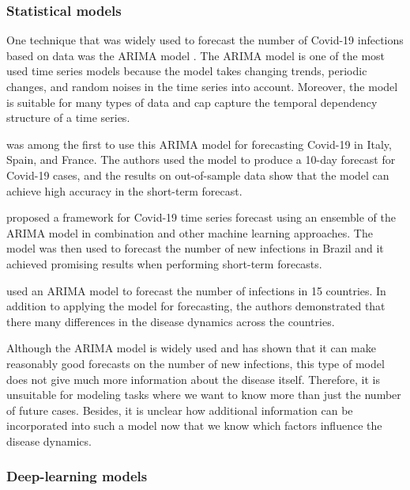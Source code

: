 \subsubsection{Statistical models}

One technique that was widely used to forecast the number of Covid-19 infections based on data was the \gls{ARIMA} model \cite{box2015time}.
The \gls{ARIMA} model is one of the most used time series models because the model takes changing trends, periodic changes, and random noises in the time series into account.
Moreover, the model is suitable for many types of data and cap capture the temporal dependency structure of a time series.

\citeauthor{ceylanEstimationCOVID19Prevalence2020} \cite{ceylanEstimationCOVID19Prevalence2020} was among the first to use this \gls{ARIMA} model for forecasting Covid-19 in Italy, Spain, and France.
The authors used the model to produce a 10-day forecast for Covid-19 cases, and the results on out-of-sample data show that the model can achieve high accuracy in the short-term forecast.

\citeauthor{ribeiroShorttermForecastingCOVID192020} \cite{ribeiroShorttermForecastingCOVID192020} proposed a framework for Covid-19 time series forecast using an ensemble of the \gls{ARIMA} model in combination and other machine learning approaches.
The model was then used to forecast the number of new infections in Brazil and it achieved promising results when performing short-term forecasts.

\citeauthor{singhPredictionCOVID19Pandemic2020} \cite{singhPredictionCOVID19Pandemic2020} used an \gls{ARIMA} model to forecast the number of infections in 15 countries.
In addition to applying the model for forecasting, the authors demonstrated that there many differences in the disease dynamics across the countries.

Although the \gls{ARIMA} model is widely used and has shown that it can make reasonably good forecasts on the number of new infections, this type of model does not give much more information about the disease itself.
Therefore, it is unsuitable for modeling tasks where we want to know more than just the number of future cases.
Besides, it is unclear how additional information can be incorporated into such a model now that we know which factors influence the disease dynamics.

\subsubsection{Deep-learning models}

